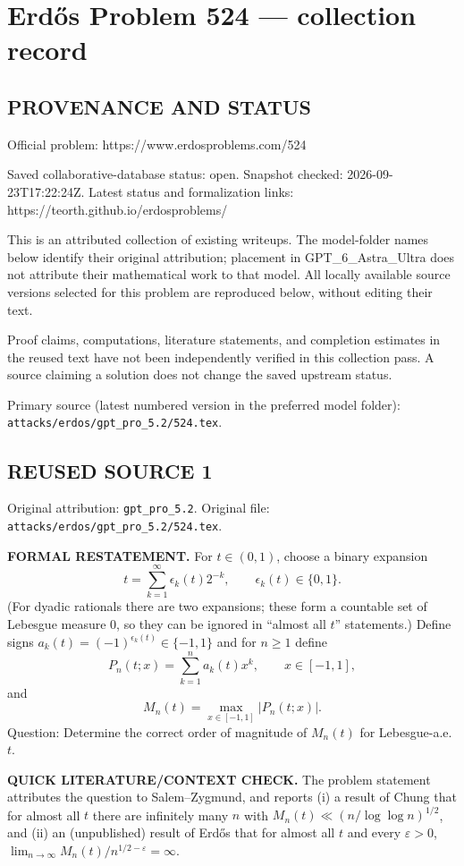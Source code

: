 \section*{Erd\H{o}s Problem 524 --- collection record}

\subsection*{PROVENANCE AND STATUS}
Official problem: https://www.erdosproblems.com/524

Saved collaborative-database status: open.
Snapshot checked: 2026-09-23T17:22:24Z.
Latest status and formalization links: https://teorth.github.io/erdosproblems/

This is an attributed collection of existing writeups. The model-folder names below identify their original attribution; placement in GPT\_6\_Astra\_Ultra does not attribute their mathematical work to that model. All locally available source versions selected for this problem are reproduced below, without editing their text.

Proof claims, computations, literature statements, and completion estimates in the reused text have not been independently verified in this collection pass. A source claiming a solution does not change the saved upstream status.

Primary source (latest numbered version in the preferred model folder): \texttt{attacks/erdos/gpt\_pro\_5.2/524.tex}.

\subsection*{REUSED SOURCE 1}
Original attribution: \texttt{gpt\_pro\_5.2}.
Original file: \texttt{attacks/erdos/gpt\_pro\_5.2/524.tex}.


\noindent\textbf{FORMAL RESTATEMENT.}
For $t\in(0,1)$, choose a binary expansion
\[t=\sum_{k=1}^\infty \epsilon_k(t)2^{-k},\qquad \epsilon_k(t)\in\{0,1\}.
\]
(For dyadic rationals there are two expansions; these form a countable set of Lebesgue measure $0$, so they can be ignored in ``almost all $t$'' statements.)
Define signs $a_k(t)=(-1)^{\epsilon_k(t)}\in\{-1,1\}$ and for $n\ge 1$ define
\[P_n(t;x)=\sum_{k=1}^n a_k(t) x^k,\qquad x\in[-1,1],
\]
and
\[M_n(t)=\max_{x\in[-1,1]} |P_n(t;x)|.
\]
Question: Determine the correct order of magnitude of $M_n(t)$ for Lebesgue-a.e. $t$.

\bigskip
\noindent\textbf{QUICK LITERATURE/CONTEXT CHECK.}
The problem statement attributes the question to Salem--Zygmund, and reports (i) a result of Chung that for almost all $t$ there are infinitely many $n$ with $M_n(t)\ll (n/\log\log n)^{1/2}$, and (ii) an (unpublished) result of Erd\H{o}s that for almost all $t$ and every $\varepsilon>0$, $\lim_{n\to\infty} M_n(t)/n^{1/2-\varepsilon}=\infty$.

